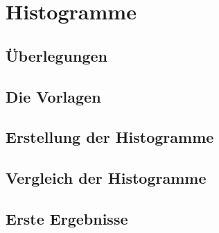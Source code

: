 \section{Histogramme}

\subsection{Überlegungen}

\subsection{Die Vorlagen}

\subsection{Erstellung der Histogramme}

\subsection{Vergleich der Histogramme}

\subsection{Erste Ergebnisse}